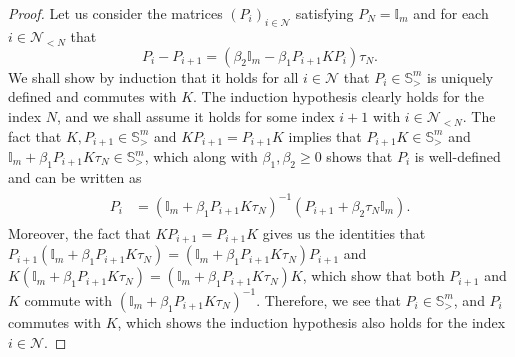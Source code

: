 \documentclass[11pt]{article}
\numberwithin{equation}{section}
\theoremstyle{definition}
\theoremstyle{remark}
\def\l{\label}  \def\f{\frac}  \def\fa{\forall}
\def\b{\beta}  \def\a{\alpha} \def\ga{\gamma}
\def\cN{\mathcal{N}}
\def\sI{{\mathbb{I}}}
\def\sS{{\mathbb{S}}}
\def\bb{\begin{equation}} \def\ee{\end{equation}}
\begin{document}
\begin{proof}
Let us consider the matrices $(P_i)_{i\in \cN}$ satisfying
$P_N=\sI_m$ and
 for each $i\in \cN_{<N}$ that
\bb\l{eq:riccati_n>m}
{P_i-P_{i+1}}
=(\b_2\sI_m-\b_1P_{i+1}KP_{i}){\tau_N}.
\ee
We shall show by induction that it holds for all $i\in \cN$ that $P_{i}\in \sS^m_>$ is uniquely defined and commutes with $K$.
The  induction hypothesis  clearly holds  for the index $N$, and we shall assume it holds for some index $i+1$ with $i\in \cN_{<N}$.
The fact that $K,P_{i+1}\in \sS^m_>$ and $KP_{i+1}=P_{i+1}K$ implies that 
$P_{i+1}K\in \sS^m_>$ and $\sI_m+\b_1 P_{i+1}K\tau_N\in \sS^m_>$, which along with $\b_1,\b_2\ge 0$ shows that $P_i$  is well-defined and can be written as 
\begin{align}\l{eq:P_i_n>m}
\begin{split}
P_i
&=(\sI_m+\b_1 P_{i+1}K\tau_N)^{-1}(P_{i+1}+\b_2\tau_N\sI_m).
\end{split}
\end{align}
Moreover, the fact that $KP_{i+1}=P_{i+1}K$ gives us the  identities
that
$P_{i+1}(\sI_m+\b_1 P_{i+1}K\tau_N)
=(\sI_m+\b_1 P_{i+1}K\tau_N)P_{i+1}$
and 
$
K(\sI_m+\b_1 P_{i+1}K\tau_N)
=(\sI_m+\b_1 P_{i+1}K\tau_N)K$,
which show that 
both 
$P_{i+1}$ and $K$ commute with $(\sI_m+\b_1 P_{i+1}K\tau_N)^{-1}$.
Therefore, we see that 
$P_i\in \sS^m_>$,
and
$P_i$ commutes with $K$,
which shows the induction hypothesis also holds for the index $i\in \cN$.



\end{proof}
\end{document}
